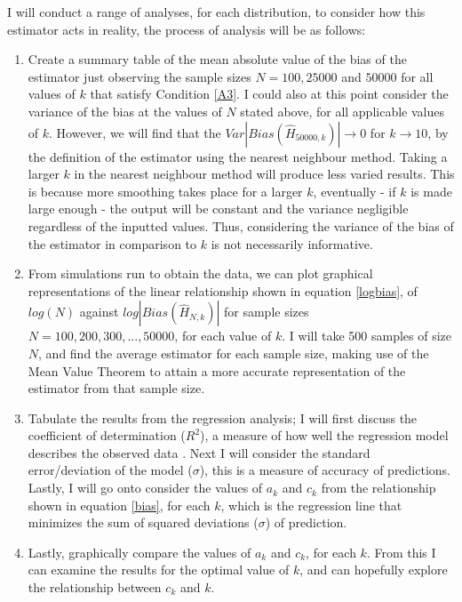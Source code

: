 \documentclass[12pt]{report}
\begin{document}
I will conduct a range of analyses, for each distribution, to consider how this estimator acts in reality, the process of analysis will be as follows:
\begin{enumerate}
\item Create a summary table of the mean absolute value of the bias of the estimator just observing the sample sizes $N=100, 25000$ and $50000$ for all values of $k$ that satisfy Condition \ref{A3}. I could also at this point consider the variance of the bias at the values of $N$ stated above, for all applicable values of $k$. However, we will find that the $Var|Bias(\hat{H}_{50000, k})| \to 0$ for $k \to 10$, by the definition of the estimator using the nearest neighbour method. Taking a larger $k$ in the nearest neighbour method will produce less varied results. This is because more smoothing takes place for a larger $k$, eventually - if $k$ is made large enough - the output will be constant and the variance negligible regardless of the inputted values. Thus, considering the variance of the bias of the estimator in comparison to $k$ is not necessarily informative. 

\item From simulations run to obtain the data, we can plot graphical representations of the linear relationship shown in equation \ref{logbias}, of $log(N)$ against $log|Bias(\hat{H}_{N, k})|$ for sample sizes $N=100, 200, 300, ..., 50000$, for each value of $k$. I will take 500 samples of size $N$, and find the average estimator for each sample size, making use of the Mean Value Theorem to attain a more accurate representation of the estimator from that sample size.

\item Tabulate the results from the regression analysis; I will first discuss the coefficient of determination ($R^2$), a measure of how well the regression model describes the observed data \cite{regression1}. Next I will consider the standard error/deviation of the model ($\sigma$), this is a measure of accuracy of predictions. Lastly, I will go onto consider the values of $a_{k}$ and $c_{k}$ from the relationship shown in equation \ref{bias}, for each $k$, which is the regression line that minimizes the sum of squared deviations ($\sigma$) of prediction.

\item Lastly, graphically compare the values of $a_{k}$ and $c_{k}$, for each $k$. From this I can examine the results for the optimal value of $k$, and can hopefully explore the relationship between $c_{k}$ and $k$.

\end{enumerate}
\end{document}
